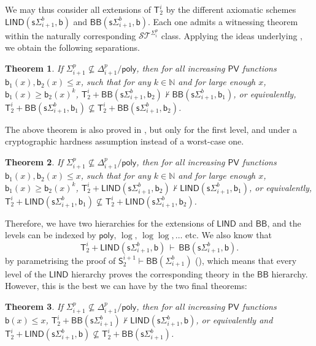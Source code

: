 \documentclass[11pt]{article}
\newcommand{\poly}{\mathsf{poly}}
\newcommand{\N}{\mathbb{N}}
\newcommand{\PV}{\mathsf{PV}}
\newcommand{\bd}{\mathsf{b}}
\newtheorem{theorem}{Theorem}[section]
\theoremstyle{definition}
\theoremstyle{definition}
\theoremstyle{remark}
\begin{document}
We may thus consider all extensions of $\mathsf{T}^i_2$ by the different axiomatic schemes $\mathsf{LIND}(\mathsf{s}\Sigma^b_{i+1},\bd)$ and $\mathsf{BB}(\mathsf{s}\Sigma^b_{i+1},\bd)$. Each one admits a witnessing theorem within the naturally corresponding $\mathcal{ST}^{\Sigma^p_i}$ class. 
Applying the ideas underlying , we obtain the following separations.

\begin{theorem}\label{thm:bbsep}
    If $\Sigma^p_{i+1}\not\subseteq \Delta^p_{i+1}/\poly$, then for all increasing $\PV$ functions $\bd_1(x), \bd_2(x) \leq x$, such that for any $k\in\N$ and for large enough $x$, $\bd_1(x)\geq \bd_2(x)^k$, $\mathsf{T}^i_2+\mathsf{BB}(\mathsf{s}\Sigma^b_{i+1},\bd_2)\not\vdash \mathsf{BB}(\mathsf{s}\Sigma^b_{i+1},\bd_1)$, or equivalently, $\mathsf{T}^i_2+\mathsf{BB}(\mathsf{s}\Sigma^b_{i+1},\bd_1)\not\subseteq \mathsf{T}^i_2+\mathsf{BB}(\mathsf{s}\Sigma^b_{i+1},\bd_2)$.
\end{theorem}

The above theorem is also proved in \cite{DBLP:journals/tocl/CookT06}, but only for the first level, and under a cryptographic hardness assumption instead of a worst-case one.

\begin{theorem}\label{thm:lindsep}
    If $\Sigma^p_{i+1}\not\subseteq \Delta^p_{i+1}/\poly$, then for all increasing $\PV$ functions $\bd_1(x), \bd_2(x) \leq x$, such that for any $k\in\N$ and for large enough $x$, $\bd_1(x)\geq \bd_2(x)^k$, $\mathsf{T}^i_2+\mathsf{LIND}(\mathsf{s}\Sigma^b_{i+1},\bd_2)\not\vdash \mathsf{LIND}(\mathsf{s}\Sigma^b_{i+1},\bd_1)$, or equivalently, $\mathsf{T}^i_2+\mathsf{LIND}(\mathsf{s}\Sigma^b_{i+1},\bd_1)\not\subseteq \mathsf{T}^i_2+\mathsf{LIND}(\mathsf{s}\Sigma^b_{i+1},\bd_2)$.
\end{theorem}

Therefore, we have two hierarchies for the extensions of $\mathsf{LIND}$ and $\mathsf{BB}$, and the levels can be indexed by $\poly,\,\log,\,\log\log,\dots$ etc. We also know that 
\[
\mathsf{T}^i_2+\mathsf{LIND}(\mathsf{s}\Sigma^b_{i+1},\bd)\,\vdash\, \mathsf{BB}(\mathsf{s}\Sigma^b_{i+1},\bd).
\]
by parametrising the proof of $\mathsf{S}^{i+1}_2\vdash\mathsf{BB}(\Sigma^b_{i+1})$ (), which means that every level of the $\mathsf{LIND}$ hierarchy proves the corresponding theory in the $\mathsf{BB}$ hierarchy. However, this is the best we can have by the two final theorems:

\begin{theorem}\label{thm:bblindsep}
    If $\Sigma^p_{i+1}\not\subseteq \Delta^p_{i+1}/\poly$, then for all increasing $\PV$ functions $\bd(x) \leq x$, $\mathsf{T}^i_2+\mathsf{BB}(\mathsf{s}\Sigma^b_{i+1})\not\vdash \mathsf{LIND}(\mathsf{s}\Sigma^b_{i+1},\bd)$, or equivalently and $\mathsf{T}^i_2+\mathsf{LIND}(\mathsf{s}\Sigma^b_{i+1},\bd)\not\subseteq\mathsf{T}^i_2+\mathsf{BB}(\mathsf{s}\Sigma^b_{i+1})$.
\end{theorem}
\end{document}
